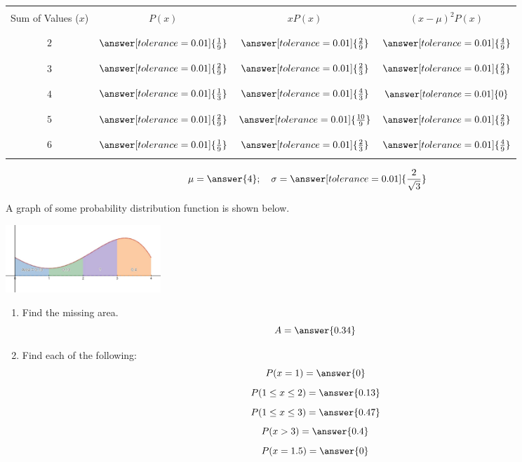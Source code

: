 \documentclass{ximera}
\begin{document}
\begin{problem}
\begin{enumerate}
\begin{center}
\begin{tabular}{|c|c|c|c|}
 \hline
 && &   \\
 Sum of Values ($x$) & $P(x)$& $xP(x)$ &$(x-\mu)^2P(x)$ \\
 && &   \\
  \hline
  && & \\
 \quad$2$\quad&$\answer[tolerance=0.01]{\frac{1}{9}}$&$\answer[tolerance=0.01]{\frac{2}{9}}$&$\answer[tolerance=0.01]{\frac{4}{9}}$ \\
  &&& \\
 \hline
  &&& \\
 \quad $3$&$\answer[tolerance=0.01]{\frac{2}{9}}$&$\answer[tolerance=0.01]{\frac{2}{3}}$ & $\answer[tolerance=0.01]{\frac{2}{9}}$ \\
  &&& \\
 \hline
  &&& \\
  \quad $4$&$\answer[tolerance=0.01]{\frac{1}{3}}$& $\answer[tolerance=0.01]{\frac{4}{3}}$ &$\answer[tolerance=0.01]{0}$ \\
  &&& \\
 \hline
  & &&\\
 \quad $5$& $\answer[tolerance=0.01]{\frac{2}{9}}$&$\answer[tolerance=0.01]{\frac{10}{9}}$  & $\answer[tolerance=0.01]{\frac{2}{9}}$\\
  &&&\\
 \hline
  & &&\\
 \quad $6$&$\answer[tolerance=0.01]{\frac{1}{9}}$ & $\answer[tolerance=0.01]{\frac{2}{3}}$ & $\answer[tolerance=0.01]{\frac{4}{9}}$\\
  &&&\\
 \hline
\end{tabular}
\end{center}
\vskip 0.5in
$$\mu=\answer{4};\quad \sigma =\answer[tolerance=0.01]{\frac{2}{\sqrt{3}}}$$
\end{enumerate}
\end{problem}


\begin{problem}\label{prob:140hom4prob5}
A graph of some probability distribution function is shown below.  
\begin{image}
   
\includegraphics[height=1in]{140H4pic2.jpg}~
 
\end{image}
\begin{enumerate}
    \item Find the missing area.  
    $$A=\answer{0.34}$$
    \item Find each of the following:
    $$P(x=1)=\answer{0}$$
    $$P(1\leq x\leq 2)=\answer{0.13}$$
    $$P(1\leq x\leq 3)=\answer{0.47}$$
    $$P(x>3)=\answer{0.4}$$
    $$P(x=1.5)=\answer{0}$$
    
\end{enumerate}
\end{problem}
\end{document}
